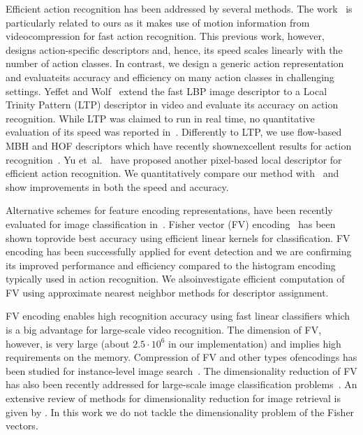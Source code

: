 \documentclass[10pt,twocolumn,letterpaper]{article}
\begin{document}
Efficient action recognition has been addressed by several
methods. The work~\cite{mpeg3,mpeg2,mpeg1} is particularly
related to ours as it makes use of motion information from videocompression for fast action recognition. This previous work,
however, designs action-specific descriptors and, hence, its
speed scales linearly with the number of action classes. In
contrast, we design a generic action representation and evaluateits accuracy and efficiency on many action classes in
challenging settings.
Yeffet and Wolf~\cite{Yeffet09} extend the fast LBP image
descriptor to a Local Trinity Pattern (LTP) descriptor in video
and evaluate its accuracy on action recognition. While LTP was
claimed to run in real time, no quantitative evaluation of its
speed was reported in~\cite{Yeffet09}. Differently to LTP, we
use flow-based MBH and HOF descriptors which have recently shownexcellent results for action recognition~\cite{Wang12}. Yu
et~al.~\cite{Yu10} have proposed another pixel-based local
descriptor for efficient action recognition. We quantitatively
compare our method with~\cite{Yu10} and show improvements in
both the speed and accuracy.

Alternative schemes for feature encoding
representations,
have been recently evaluated for image classification
in~\cite{Chatfield11}.
Fisher vector (FV) encoding~\cite{Perronnin10} has been shown toprovide best accuracy using efficient linear kernels for
classification. FV encoding has been successfully applied for
event detection \cite{Revaud13} and we are confirming its
improved performance and efficiency compared to the
histogram encoding typically used in action recognition. We alsoinvestigate efficient computation of FV using approximate
nearest neighbor methods for descriptor assignment.

FV encoding enables high recognition accuracy using fast linear
classifiers which is a big advantage for large-scale video
recognition. The dimension of FV, however, is very large (about
$2.5\cdot10^6$ in our implementation) and implies high
requirements on the memory. Compression of FV and other types ofencodings has been studied for instance-level image
search~\cite{Jegou12}. The dimensionality reduction of FV has
also been recently addressed for large-scale image
classification problems~\cite{Mensink12,Perronnin12,Sanchez13}.
An extensive review of methods for dimensionality reduction for
image retrieval is given by \cite{Grauman13}.
In this work we do not tackle the dimensionality problem of the
Fisher vectors.
\end{document}
